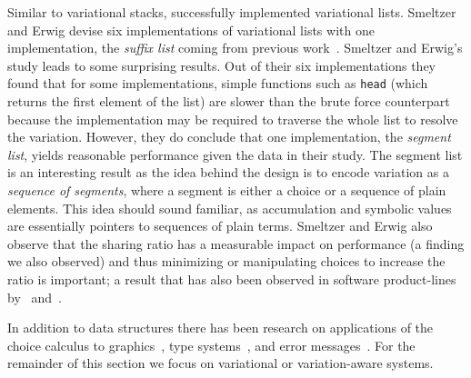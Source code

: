 Similar to variational stacks, \citet{SE17fosd} successfully implemented
variational lists. Smeltzer and Erwig devise six implementations of variational
lists with one implementation, the \emph{suffix list} coming from previous
work~\cite{EW11gttse}. Smeltzer and Erwig's study leads to some surprising
results. Out of their six implementations they found that for some
implementations, simple functions such as \texttt{head} (which returns the first
element of the list) are slower than the brute force counterpart because the
implementation may be required to traverse the whole list to resolve the
variation. However, they do conclude that one implementation, the \emph{segment
  list}, yields reasonable performance given the data in their study. The
segment list is an interesting result as the idea behind the design is to encode
variation as a \emph{sequence of segments}, where a segment is either a choice
or a sequence of plain elements. This idea should sound familiar, as
accumulation and symbolic values are essentially pointers to sequences of plain
terms. Smeltzer and Erwig also observe that the sharing ratio has a measurable
impact on performance (a finding we also observed) and thus minimizing or
manipulating choices to increase the ratio is important; a result that has also
been observed in software product-lines by~\citet{ARW+:ICSE13}
and~\citet{KRE+:FOSD12}.

In addition to data structures there has been research on applications of the
choice calculus to graphics~\citep{ES18diagrams}, type
systems~\citep{CCEW18popl,CCW18icfp,CEW:TOPLAS14,CEW12icfp}, and error
messages~\citep{CES17jvlc,CE14popl,CEW12icfp,CES14hcc}. For the remainder of
this section we focus on variational or variation-aware systems.

